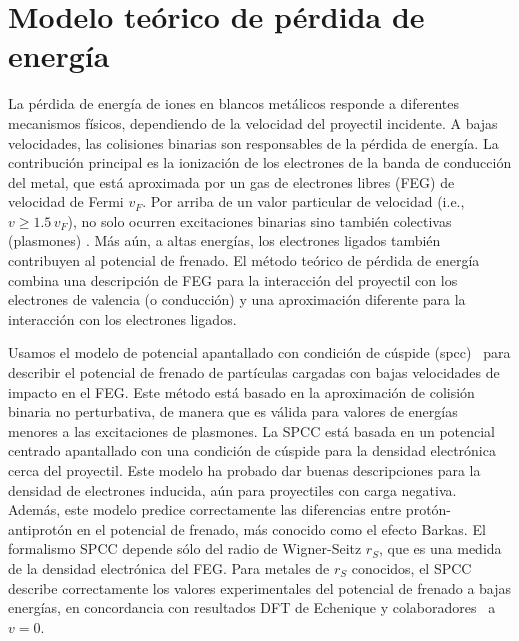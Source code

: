 \section{Modelo teórico de pérdida de energía}
\label{sec:method-stopping}

La pérdida de energía de iones en blancos metálicos responde a diferentes
mecanismos físicos, dependiendo de la velocidad del proyectil incidente.
A bajas velocidades, las colisiones binarias son responsables de la 
pérdida de energía. La contribución principal es la ionización de los 
electrones de la banda de conducción del metal, que está aproximada por 
un gas de electrones libres (FEG) de velocidad de Fermi $v_F$. Por arriba
de un valor particular de velocidad (i.e., $v\geq 1.5\,v_F$), no solo 
ocurren excitaciones binarias sino también colectivas (plasmones) 
\cite{Montanari:17}. Más aún, a altas energías, los electrones ligados
también contribuyen al potencial de frenado. El método teórico de 
pérdida de energía combina una descripción de FEG para la interacción del
proyectil con los electrones de valencia (o conducción) y una 
aproximación diferente para la interacción con los electrones ligados.

Usamos el modelo de potencial apantallado con condición de cúspide 
(\acs{spcc})~\cite{Montanari:17} para describir el potencial de frenado 
de partículas cargadas con bajas velocidades de impacto en el FEG. Este 
método está basado en la aproximación de colisión binaria no 
perturbativa, de manera que es válida para valores de energías menores a 
las excitaciones de plasmones. La SPCC está basada en un potencial 
centrado apantallado con una condición de cúspide para la densidad 
electrónica cerca del proyectil. Este modelo ha probado dar buenas 
descripciones para la densidad de electrones inducida, aún para 
proyectiles con carga negativa. Además, este modelo predice correctamente 
las diferencias entre protón-antiprotón en el potencial de frenado, más 
conocido como el efecto Barkas. El formalismo SPCC depende sólo del radio 
de Wigner-Seitz $r_S$, que es una medida de la densidad electrónica del 
FEG. Para metales de $r_S$ conocidos, el SPCC describe correctamente los 
valores experimentales del potencial de frenado a bajas energías, en 
concordancia con resultados DFT de Echenique y 
colaboradores~\cite{Echenique:81,Nagy:89} a $v=0$.

